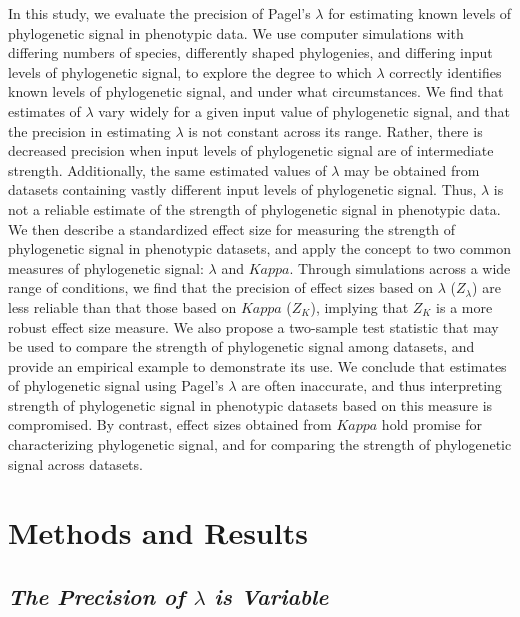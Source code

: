\documentclass[
]{article}
\begin{document}
In this study, we evaluate the precision of Pagel's \(\lambda\) for
estimating known levels of phylogenetic signal in phenotypic data. We
use computer simulations with differing numbers of species, differently
shaped phylogenies, and differing input levels of phylogenetic signal,
to explore the degree to which \(\lambda\) correctly identifies known
levels of phylogenetic signal, and under what circumstances. We find
that estimates of \(\lambda\) vary widely for a given input value of
phylogenetic signal, and that the precision in estimating \(\lambda\) is
not constant across its range. Rather, there is decreased precision when
input levels of phylogenetic signal are of intermediate strength.
Additionally, the same estimated values of \(\lambda\) may be obtained
from datasets containing vastly different input levels of phylogenetic
signal. Thus, \(\lambda\) is not a reliable estimate of the strength of
phylogenetic signal in phenotypic data. We then describe a standardized
effect size for measuring the strength of phylogenetic signal in
phenotypic datasets, and apply the concept to two common measures of
phylogenetic signal: \(\lambda\) and \(Kappa\). Through simulations
across a wide range of conditions, we find that the precision of effect
sizes based on \(\lambda\) (\(Z_{\lambda}\)) are less reliable than that
those based on \(Kappa\) (\(Z_K\)), implying that \(Z_K\) is a more
robust effect size measure. We also propose a two-sample test statistic
that may be used to compare the strength of phylogenetic signal among
datasets, and provide an empirical example to demonstrate its use. We
conclude that estimates of phylogenetic signal using Pagel's \(\lambda\)
are often inaccurate, and thus interpreting strength of phylogenetic
signal in phenotypic datasets based on this measure is compromised. By
contrast, effect sizes obtained from \(Kappa\) hold promise for
characterizing phylogenetic signal, and for comparing the strength of
phylogenetic signal across datasets.

\hypertarget{methods-and-results}{%
\section{Methods and Results}\label{methods-and-results}}

\hypertarget{the-precision-of-lambda-is-variable}{%
\subsection{\texorpdfstring{\emph{The Precision of \(\lambda\) is
Variable}}{The Precision of \textbackslash lambda is Variable}}\label{the-precision-of-lambda-is-variable}}
\end{document}
